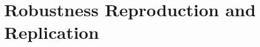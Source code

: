 \documentclass[12pt,a4paper]{article}
\begin{document}
%
%
%
%
%

\section{Robustness Reproduction and Replication}
\end{document}
